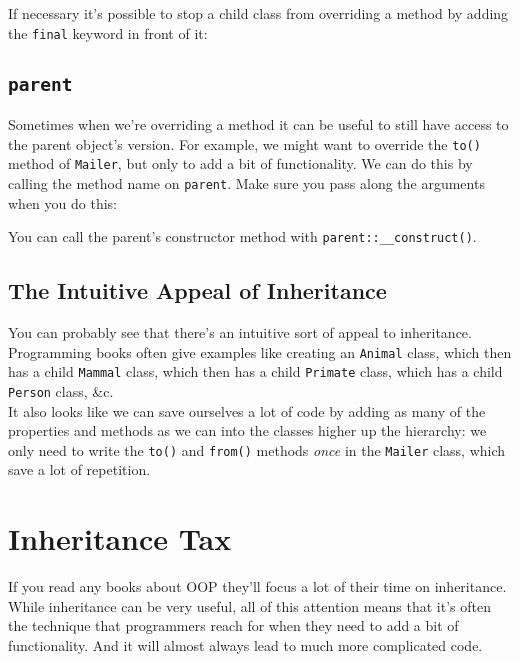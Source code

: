 
If necessary it's possible to stop a child class from overriding a method by adding the \texttt{final} keyword in front of it:


\subsection{\texttt{parent}}

Sometimes when we're overriding a method it can be useful to still have access to the parent object's version. For example, we might want to override the \texttt{to()} method of \texttt{Mailer}, but only to add a bit of functionality. We can do this by calling the method name on \texttt{parent}. Make sure you pass along the arguments when you do this:


You can call the parent's constructor method with \texttt{parent::\_\_construct()}.


\subsection{The Intuitive Appeal of Inheritance}

You can probably see that there's an intuitive sort of appeal to inheritance. Programming books often give examples like creating an \texttt{Animal} class, which then has a child \texttt{Mammal} class, which then has a child \texttt{Primate} class, which has a child \texttt{Person} class, \&c.
\\

It also looks like we can save ourselves a lot of code by adding as many of the properties and methods as we can into the classes higher up the hierarchy: we only need to write the \texttt{to()} and \texttt{from()} methods \textit{once} in the \texttt{Mailer} class, which save a lot of repetition.

\section{Inheritance Tax}


If you read any books about OOP they'll focus a lot of their time on inheritance. While inheritance can be very useful, all of this attention means that it's often the technique that programmers reach for when they need to add a bit of functionality. And it will almost always lead to much more complicated code.
\\

